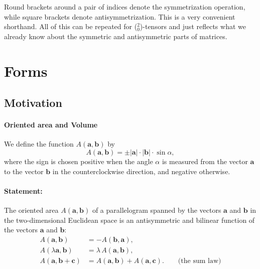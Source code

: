     Round brackets around a pair of indices denote the symmetrization operation, while square brackets denote antisymmetrization. This is a very convenient shorthand. All of this can be repeated for ($^2_0$)-tensors and just reflects what we already know about the symmetric and antisymmetric parts of matrices.


\section{Forms}
\subsection{Motivation\label{sub:Motivation-for-exterior}}



\paragraph{Oriented area and Volume\label{sub:Two-dimensional-oriented}}

We define the  function $A(\mathbf{a},\mathbf{b})$ by \[
A(\mathbf{a},\mathbf{b})=\pm\left|\mathbf{a}\right|\cdot\left|\mathbf{b}\right|\cdot\sin\alpha,\]
where the sign is chosen positive when the angle $\alpha$ is measured
from the vector $\mathbf{a}$ to the vector $\mathbf{b}$ in the counterclockwise
direction, and negative otherwise.


\paragraph{Statement:}

The oriented area $A(\mathbf{a},\mathbf{b})$ of a parallelogram spanned
by the vectors $\mathbf{a}$ and $\mathbf{b}$ in the two-dimen\-sion\-al
Euclidean space is an antisymmetric and bilinear function of the vectors
$\mathbf{a}$ and $\mathbf{b}$:\begin{align*}
A(\mathbf{a},\mathbf{b}) & =-A(\mathbf{b},\mathbf{a}),\\
A(\lambda\mathbf{a},\mathbf{b}) & =\lambda\, A(\mathbf{a},\mathbf{b}),\\
A(\mathbf{a},\mathbf{b}+\mathbf{c}) & =A(\mathbf{a},\mathbf{b})+A(\mathbf{a},\mathbf{c}).\qquad\text{(the sum law)}\end{align*}


